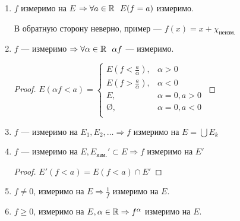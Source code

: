 \begin{prop}\itemfix
    \begin{enumerate}
        \item \(f\) измеримо на \(E\) \( \Rightarrow \forall a\in\mathbb{R} \ \ E(f = a)\) измеримо.

              В обратную сторону неверно, пример --- \(f(x) = x + \chi_\text{неизм.}\)

        \item \(f\) --- измеримо \( \Rightarrow \forall \alpha\in\R \ \ \alpha f\) --- измеримо.

              \begin{proof}
                  \(E(\alpha f < a) = \begin{cases}
                      E(f < \frac{a}{\alpha}), & \alpha > 0        \\
                      E(f > \frac{a}{\alpha}), & \alpha < 0        \\
                      E,                       & \alpha = 0, a > 0 \\
                      \text{\O},               & \alpha = 0, a < 0 \\
                  \end{cases}\)
              \end{proof}
        \item \(f\) --- измеримо на \(E_1, E_2, \dots \Rightarrow f\) измеримо на \(E = \bigcup E_k\)
        \item \(f\) --- измеримо на \(E, E_{\text{изм.}}'\subset E \Rightarrow f\) измеримо на \(E'\)
              \begin{proof}
                  \(E'(f < a) = E(f < a)\cap E'\)
              \end{proof}
        \item \(f \neq 0\), измеримо на \(E \Rightarrow \frac{1}{f}\) измеримо на \(E\).
        \item \(f \geq 0\), измеримо на \(E, \alpha\in\mathbb{R} \Rightarrow f^\alpha\) измеримо на \(E\).
    \end{enumerate}
\end{prop}

